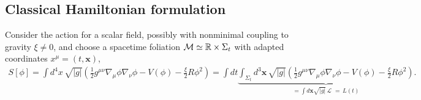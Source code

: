 \documentclass[../QFT_main.tex]{subfiles}
\begin{document}
\subsection{Classical Hamiltonian formulation}
%
\begin{mytheorem}
Consider the action for a scalar field, possibly with nonminimal coupling to gravity $\xi\neq0$, and choose a spacetime foliation $\mathcal{M}\simeq \mathbb{R}\times\Sigma_t$ with adapted coordinates $x^\mu=(t,\mathbf{x})$,
{\small
\begin{align}
    S[\phi] = \int d^4x\, \sqrt{|g|} \left( \frac{1}{2} g^{\mu\nu} \nabla_\mu \phi \nabla_\nu \phi - V(\phi) - \tfrac{\xi}{2} R \phi^2 \right) = \int dt \underbrace{\int_{\Sigma_t} d^3\mathbf{x}\, \sqrt{|g|} \left( \frac{1}{2} g^{\mu\nu} \nabla_\mu \phi \nabla_\nu \phi - V(\phi) - \tfrac{\xi}{2} R \phi^2 \right)}_{=\int d\mathbf{x}\sqrt{|g|}\, \mathcal{L}\,\,=  \, L(t)}.
\end{align}}
\vspace{-8mm}


\end{mytheorem}
\end{document}
